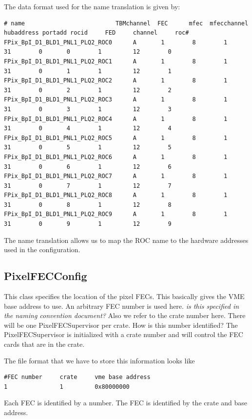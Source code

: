 The data format used for the name translation is given by:
{\tiny
\begin{verbatim}
# name                          TBMchannel  FEC      mfec  mfecchannel hubaddress portadd rocid     FED     channel     roc#
FPix_BpI_D1_BLD1_PNL1_PLQ2_ROC0      A       1        8        1          31        0       0        1         12        0
FPix_BpI_D1_BLD1_PNL1_PLQ2_ROC1      A       1        8        1          31        0       1        1         12        1
FPix_BpI_D1_BLD1_PNL1_PLQ2_ROC2      A       1        8        1          31        0       2        1         12        2
FPix_BpI_D1_BLD1_PNL1_PLQ2_ROC3      A       1        8        1          31        0       3        1         12        3
FPix_BpI_D1_BLD1_PNL1_PLQ2_ROC4      A       1        8        1          31        0       4        1         12        4
FPix_BpI_D1_BLD1_PNL1_PLQ2_ROC5      A       1        8        1          31        0       5        1         12        5
FPix_BpI_D1_BLD1_PNL1_PLQ2_ROC6      A       1        8        1          31        0       6        1         12        6
FPix_BpI_D1_BLD1_PNL1_PLQ2_ROC7      A       1        8        1          31        0       7        1         12        7
FPix_BpI_D1_BLD1_PNL1_PLQ2_ROC8      A       1        8        1          31        0       8        1         12        8
FPix_BpI_D1_BLD1_PNL1_PLQ2_ROC9      A       1        8        1          31        0       9        1         12        9
\end{verbatim}
}
The name translation allows us to map the ROC name to the hardware addresses
used in the configuration.

\subsection{PixelFECConfig}

This class specifies the location of the pixel FECs. This
basically gives the VME base address to use. An arbitrary FEC
number is used here. {\it is this specified in the naming
convention document?} Also we refer to the crate number here. 
There will be one PixelFECSupervisor per crate. How is this
number identified? The PixelFECSupervisor is initialized
with a crate number and will control the FEC cards that are 
in the crate.

The file format that we have to store this information looks like
\begin{verbatim}
#FEC number     crate     vme base address
1               1         0x80000000
\end{verbatim}
Each FEC is identified by a number. The FEC is identified by the 
crate and base address.


